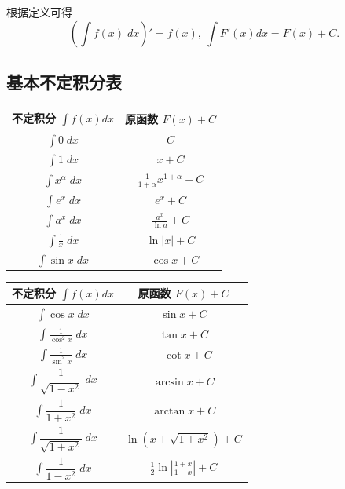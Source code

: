 \documentclass[cn,toc=twocol]{elegantbook}
\newcommand{\ds}{\displaystyle}
\begin{document}
根据定义可得
\[
	\left(\int f(x) \; dx\right)' = f(x),\ \int F'(x) dx = F(x) + C.
\]

\subsection{基本不定积分表}


\begin{center}
  \renewcommand{\arraystretch}{1.4}
  \begin{minipage}[t]{0.49\textwidth}
    \centering
    \begin{tabular}{cc}
      \toprule
      不定积分 $\ds \int f(x) dx$ &  原函数 $F(x) + C$ \\
      \midrule
      $\ds \int 0 \; dx$ & $C$\\
      $\ds \int 1 \; dx$ & $x + C$\\
      $\ds \int x^\alpha \; dx$ & $\ds \frac{1}{1+\alpha} x^{1+\alpha} + C$\\
      $\ds \int e^x \; dx$       & $e^x + C$\\
      $\ds \int a^x \; dx$       & $\ds \frac{a^x}{\ln a} + C$\\
      $\ds \int \frac{1}{x} \; dx$     & $\ln \lvert x \rvert + C$\\
      $\ds \int \sin x \; dx$    & $-\cos x + C$\\
      \bottomrule
    \end{tabular}
  \end{minipage}\hfill
  \begin{minipage}[t]{0.49\textwidth}
    \centering
    \begin{tabular}{cc}
      \toprule
      不定积分 $\ds \int f(x) dx$ &  原函数 $F(x) + C$ \\
      \midrule
      $\ds \int \cos x \; dx$    & $\sin x + C$ \\
      $\ds \int \frac{1}{\cos^2 x} \; dx$    & $\tan x + C$ \\
      $\ds \int \frac{1}{\sin^2 x} \; dx$    & $-\cot x + C$ \\
      $\ds \int \dfrac{1}{\sqrt{1-x^2}} \; dx$ & $\arcsin x + C$ \\
      $\ds \int \dfrac{1}{1+x^2} \; dx$ & $\arctan x + C$ \\
      $\ds \int \dfrac{1}{\sqrt{1+x^2}} \; dx$ & $\ln \left(x + \sqrt{1+x^2}\right) + C$ \\
      $\ds \int \dfrac{1}{1-x^2} \; dx$ & $\ds\frac12\ln \left\lvert \frac{1+x}{1-x} \right\rvert + C$ \\
      \bottomrule
    \end{tabular}
  \end{minipage}
  \vspace{0.4em}
\end{center}
\end{document}

